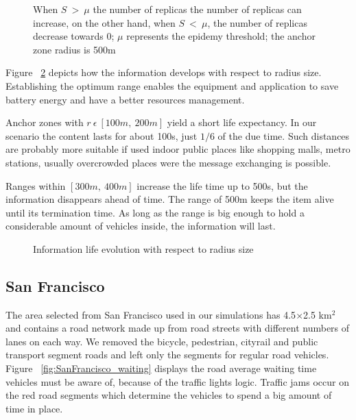  \begin{figure}[h]
	\centering
	\def\svgwidth{\columnwidth}
	
	\caption{ When $S\ >\ \mu$ the number of replicas the number of replicas can
	increase, on the other hand, when $S\ <\ \mu$, the number of replicas decrease
	towards 0; $\mu$ represents the epidemy threshold; the anchor zone radius is
	500m}
 	\label{fig:Beijing_info_evolution_epidemy}
 \end{figure}
 
 Figure ~\ref{fig:Beijing_info_evolution_range} depicts how the information
 develops with respect to radius size. Establishing the optimum range enables
 the equipment and application to save battery energy and have a better
 resources management. 
 
 Anchor zones with $r\ \epsilon\ [100m,\ 200m]$ yield a short life expectancy.
 In our scenario the content lasts for about 100s, just $1/6$ of the due time.
 Such distances are probably more suitable if used indoor public places like
 shopping malls, metro stations, usually overcrowded places were the message
 exchanging is possible.
 
 Ranges within $[300m,\ 400m]$ increase the life time up to 500s, but the
 information disappears ahead of time. The range of 500m keeps the item alive
 until its termination time. As long as the range is big enough to hold a
 considerable amount of vehicles inside, the information will last.
 
 \begin{figure}[h]
	\centering
	\def\svgwidth{\columnwidth}
	
	\caption{Information life evolution with respect to radius size}
 	\label{fig:Beijing_info_evolution_range}
 \end{figure}
 
\subsection{San Francisco}

The area selected from San Francisco used in our simulations has 4.5$\times$2.5
km$^2$ and contains a road network made up from road streets with different
numbers of lanes on each way. We removed the bicycle, pedestrian, cityrail and
public transport segment roads and left only the segments for regular road
vehicles. Figure ~\ref{fig:SanFrancisco_waiting} displays the road average
waiting time vehicles must be aware of, because of the traffic lights logic.
Traffic jams occur on the red road segments which determine the vehicles to
spend a big amount of time in place.

